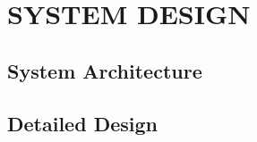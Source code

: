 \chapter{\MakeUppercase{System Design}}
\label{chap:system-design}

\section{System Architecture}
\label{sec:system-architecture}
\paragraph{}

\section{Detailed Design}
\label{sec:detailed-design}
\paragraph{}
